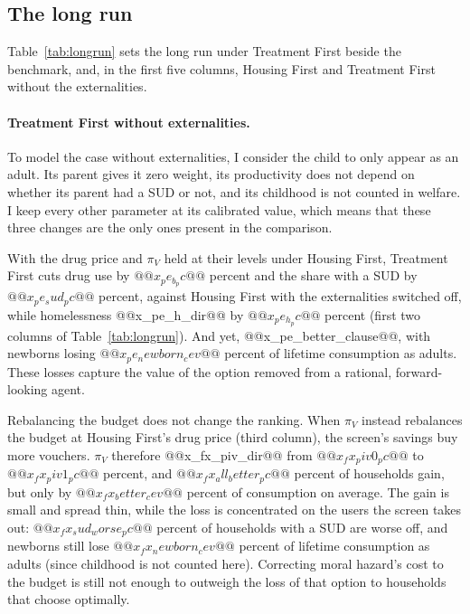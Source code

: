 \documentclass[10pt]{article}
\begin{document}
\subsection{The long run}\label{sec:longrun}

Table~\ref{tab:longrun} sets the long run under Treatment First beside the benchmark, and, in the first five columns, Housing First and Treatment First without the externalities.

\paragraph{Treatment First without externalities.}   To model the case without externalities, I consider the child to only appear as an adult. Its parent gives it zero weight, its productivity does not depend on whether its parent had a SUD or not, and its childhood is not counted in welfare. I keep every other parameter at its calibrated value, which means that these three changes are the only ones present in the comparison.

With the drug price and $\pi_V$ held at their levels under Housing First, Treatment First cuts drug use by $@@x_pe_b_pc@@$ percent and the share with a SUD by $@@x_pe_sud_pc@@$ percent, against Housing First with the externalities switched off, while homelessness @@x_pe_h_dir@@ by $@@x_pe_h_pc@@$ percent (first two columns of Table~\ref{tab:longrun}). And yet, @@x_pe_better_clause@@, with newborns losing $@@x_pe_newborn_cev@@$ percent of lifetime consumption as adults. These losses capture the value of the option removed from a rational, forward-looking agent.

Rebalancing the budget does not change the ranking. When $\pi_V$ instead rebalances the budget at Housing First's drug price (third column), the screen's savings buy more vouchers. $\pi_V$ therefore @@x_fx_piv_dir@@ from $@@x_fx_piv0_pc@@$ to $@@x_fx_piv1_pc@@$ percent, and $@@x_fx_all_better_pc@@$ percent of households gain, but only by $@@x_fx_better_cev@@$ percent of consumption on average. The gain is small and spread thin, while the loss is concentrated on the users the screen takes out: $@@x_fx_sud_worse_pc@@$ percent of households with a SUD are worse off, and newborns still lose $@@x_fx_newborn_cev@@$ percent of lifetime consumption as adults (since childhood is not counted here). Correcting moral hazard's cost to the budget is still not enough to outweigh the loss of that option to households that choose optimally.
\end{document}
